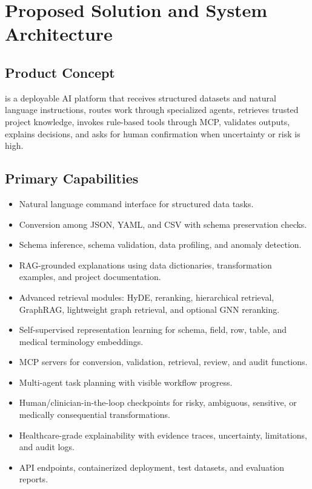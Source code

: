 \section{Proposed Solution and System Architecture}

\subsection{Product Concept}

\projectname{} is a deployable AI platform that receives structured datasets and natural language instructions, routes work through specialized agents, retrieves trusted project knowledge, invokes rule-based tools through MCP, validates outputs, explains decisions, and asks for human confirmation when uncertainty or risk is high.

\subsection{Primary Capabilities}

\begin{itemize}
  \item Natural language command interface for structured data tasks.
  \item Conversion among JSON, YAML, and CSV with schema preservation checks.
  \item Schema inference, schema validation, data profiling, and anomaly detection.
  \item RAG-grounded explanations using data dictionaries, transformation examples, and project documentation.
  \item Advanced retrieval modules: HyDE, reranking, hierarchical retrieval, GraphRAG, lightweight graph retrieval, and optional GNN reranking.
  \item Self-supervised representation learning for schema, field, row, table, and medical terminology embeddings.
  \item MCP servers for conversion, validation, retrieval, review, and audit functions.
  \item Multi-agent task planning with visible workflow progress.
  \item Human/clinician-in-the-loop checkpoints for risky, ambiguous, sensitive, or medically consequential transformations.
  \item Healthcare-grade explainability with evidence traces, uncertainty, limitations, and audit logs.
  \item API endpoints, containerized deployment, test datasets, and evaluation reports.
\end{itemize}


